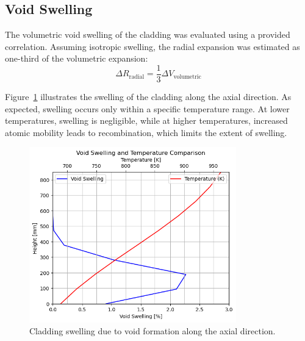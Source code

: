 \subsection{Void Swelling}
The volumetric void swelling of the cladding was evaluated using a provided correlation. Assuming isotropic swelling, the radial expansion was estimated as one-third of the volumetric expansion:
\[
\Delta R_{\text{radial}} = \frac{1}{3} \Delta V_{\text{volumetric}}
\]

Figure~\ref{fig:void_swelling} illustrates the swelling of the cladding along the axial direction. As expected, swelling occurs only within a specific temperature range. At lower temperatures, swelling is negligible, while at higher temperatures, increased atomic mobility leads to recombination, which limits the extent of swelling.

\begin{figure}[H]
\centering
\includegraphics[width=0.8\textwidth]{void_swell.png}
\caption{Cladding swelling due to void formation along the axial direction.}
\label{fig:void_swelling}
\end{figure}
